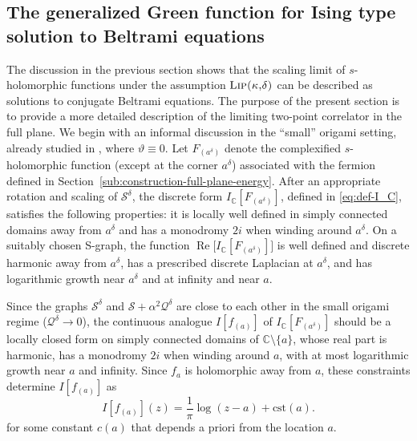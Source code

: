 \documentclass[reqno]{amsart}
\numberwithin{equation}{section}
\theoremstyle{definition}
\theoremstyle{remark}
\renewcommand\Re{\operatorname{Re}}
\newcommand\cQ{\mathcal{Q}}
\newcommand\cS{\mathcal{S}}
\def\LipKd{{\mbox{\textsc{Lip(}$\kappa$\textsc{,}$\delta$\textsc{)}}}}
\begin{document}
\subsection{The generalized Green function for Ising type solution to Beltrami equations}\label{sub:generalised-logarithm}
The discussion in the previous section shows that the scaling limit of $s$-holomorphic functions under the assumption $\LipKd$ can be described as solutions to conjugate Beltrami equations. The purpose of the present section is to provide a more detailed description of the limiting two-point correlator in the full plane. We begin with an informal discussion in the “small” origami setting, already studied in \cite{CLR1}, where $\vartheta \equiv 0$. Let $F_{(a^\delta)}$ denote the complexified $s$-holomorphic function (except at the corner $a^\delta$) associated with the fermion defined in Section~\ref{sub:construction-full-plane-energy}. After an appropriate rotation and scaling of $\cS^\delta$, the discrete form $I_{\mathbb{C}}[F_{(a^\delta)}]$, defined in \eqref{eq:def-I_C}, satisfies the following properties: it is locally well defined in simply connected domains away from $a^\delta$ and has a monodromy $2i$ when winding around $a^\delta$. On a suitably chosen S-graph, the function $\Re\big[I_{\mathbb{C}}[F_{(a^\delta)}]\big]$ is well defined and discrete harmonic away from $a^\delta$, has a prescribed discrete Laplacian at $a^\delta$, and has logarithmic growth near $a^\delta$ and at infinity and near $a$. 

Since the graphs $\cS^\delta$ and $\cS + \alpha^2 \cQ^\delta$ are close to each other in the small origami regime ($\cQ^\delta \to 0$), the continuous analogue $I[f_{(a)}]$ of $I_{\mathbb{C}}[F_{(a^\delta)}]$ should be a locally closed form on simply connected domains of $\mathbb{C} \setminus \{a\}$, whose real part is harmonic, has a monodromy $2i$ when winding around $a$, with at most logarithmic growth near $a$ and infinity. Since $f_a$ is holomorphic away from $a$, these constraints determine $I[f_{(a)}]$ as
\[
    I[f_{(a)}](z) = \frac{1}{\pi} \log(z - a) + \text{cst}(a).
\]
for some constant $c(a)$ that depends a priori from the location $a$.
\end{document}

